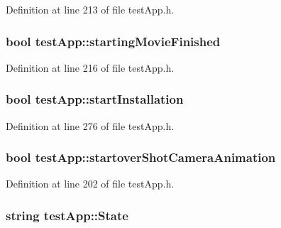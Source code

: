 Definition at line 213 of file test\-App.\-h.

\hypertarget{classtest_app_aea3cb9f5f0061a42a4953d6b6c949036}{
\subsubsection[{starting\-Movie\-Finished}]{\setlength{\rightskip}{0pt plus 5cm}bool test\-App\-::starting\-Movie\-Finished}}\label{classtest_app_aea3cb9f5f0061a42a4953d6b6c949036}


Definition at line 216 of file test\-App.\-h.

\hypertarget{classtest_app_a8a65a6d1a473417cec1c2ac2e6116aae}{
\subsubsection[{start\-Installation}]{\setlength{\rightskip}{0pt plus 5cm}bool test\-App\-::start\-Installation}}\label{classtest_app_a8a65a6d1a473417cec1c2ac2e6116aae}


Definition at line 276 of file test\-App.\-h.

\hypertarget{classtest_app_ad2fca6ce5e37462cd820afc48633324d}{
\subsubsection[{startover\-Shot\-Camera\-Animation}]{\setlength{\rightskip}{0pt plus 5cm}bool test\-App\-::startover\-Shot\-Camera\-Animation}}\label{classtest_app_ad2fca6ce5e37462cd820afc48633324d}


Definition at line 202 of file test\-App.\-h.

\hypertarget{classtest_app_a8ce5505df4526abed238956b65956edd}{
\subsubsection[{State}]{\setlength{\rightskip}{0pt plus 5cm}string test\-App\-::\-State}}\label{classtest_app_a8ce5505df4526abed238956b65956edd}


